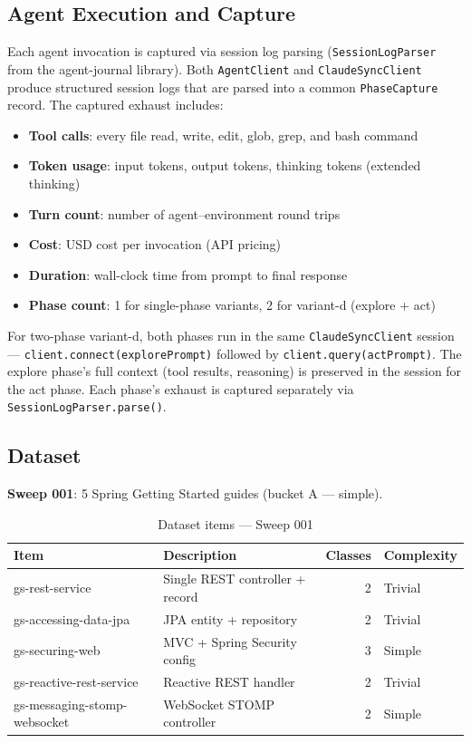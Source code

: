 \documentclass[11pt,a4paper]{article}
\begin{document}
\subsection{Agent Execution and Capture}

Each agent invocation is captured via session log parsing (\texttt{SessionLogParser}
from the agent-journal library). Both \texttt{AgentClient} and \texttt{ClaudeSyncClient}
produce structured session logs that are parsed into a common \texttt{PhaseCapture}
record. The captured exhaust includes:

\begin{itemize}
  \item \textbf{Tool calls}: every file read, write, edit, glob, grep, and bash command
  \item \textbf{Token usage}: input tokens, output tokens, thinking tokens (extended thinking)
  \item \textbf{Turn count}: number of agent--environment round trips
  \item \textbf{Cost}: USD cost per invocation (API pricing)
  \item \textbf{Duration}: wall-clock time from prompt to final response
  \item \textbf{Phase count}: 1 for single-phase variants, 2 for variant-d (explore + act)
\end{itemize}

For two-phase variant-d, both phases run in the same \texttt{ClaudeSyncClient}
session --- \texttt{client.connect(explorePrompt)} followed by
\texttt{client.query(actPrompt)}. The explore phase's full context (tool
results, reasoning) is preserved in the session for the act phase.
Each phase's exhaust is captured separately via \texttt{SessionLogParser.parse()}.

\subsection{Dataset}

\textbf{Sweep 001}: 5 Spring Getting Started guides (bucket A --- simple).

\begin{table}[H]
\centering
\caption{Dataset items --- Sweep 001}
\label{tab:dataset}
\small
\begin{tabular}{@{}llrl@{}}
\toprule
\textbf{Item} & \textbf{Description} & \textbf{Classes} & \textbf{Complexity} \\
\midrule
gs-rest-service            & Single REST controller + record     & 2  & Trivial \\
gs-accessing-data-jpa      & JPA entity + repository             & 2  & Trivial \\
gs-securing-web            & MVC + Spring Security config        & 3  & Simple \\
gs-reactive-rest-service   & Reactive REST handler               & 2  & Trivial \\
gs-messaging-stomp-websocket & WebSocket STOMP controller        & 2  & Simple \\
\bottomrule
\end{tabular}
\end{table}
\end{document}
